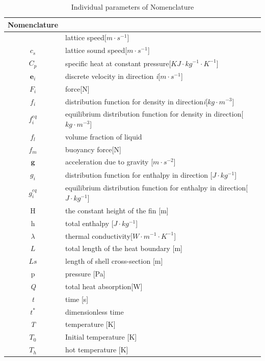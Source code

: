 \documentclass[preprint,12pt]{elsarticle}
\begin{document}
\begin{table}[H]
	\centering
	\footnotesize
	\caption{Individual parameters of Nomenclature}
	\begin{tabular}{cl}
		\toprule
		Nomenclature  &    \\
		\midrule
		\text{c}  & lattice speed[$ m \cdot  s^{-1} $] \\
	$c_{s}$  & lattice sound speed[$ m \cdot  s^{-1} $]    \\
		$C_{p}$ & specific heat at constant pressure[$ KJ \cdot kg^{-1}\cdot K^{-1} $]     \\
	$\boldsymbol{e}_{i}$ & discrete velocity in direction \textit{i}[$ m \cdot  s^{-1} $]  \\
		$F_{i}$ & force[N]    \\
	$f_{i}$& distribution function for density in direction\textit{i}[$ kg \cdot  m^{-3} $]    \\
    $f_i^{eq}$& equilibrium distribution function for density in direction[$ kg \cdot  m^{-3} $]    \\
	$f_{l}$& volume fraction of liquid    \\
	$f_m$&buoyancy force[N]     \\	
	$\mathbf{g}$& acceleration due to gravity [$ m \cdot  s^{-2} $]   \\
    $g_{i}$& distribution function for enthalpy in direction [$ J \cdot  kg^{-1} $]   \\
   	$g_{i}^{eq}$& equilibrium distribution function for enthalpy in direction[$ J \cdot  kg^{-1} $]    \\
	$\text{H}$& the constant height of the fin [m]   \\
	$\text{h}$& total enthalpy [$ J \cdot  kg^{-1} $]   \\
	$\lambda$& thermal conductivity[$ W \cdot m^{-1}\cdot K^{-1} $]      \\
    $\textit{L}$& total length of the heat boundary [m]   \\
   	$\textit{L{s}}$& length of shell cross-section [m]    \\
\textit{$\text{p}$}&  pressure [Pa]   \\	
	\textit{{Q}}& total heat absorption[W]    \\
		\textit{t}& time [s]     \\
$ 	t^{*} $& dimensionless time    \\
	\textit{T}& temperature [K]    \\
$ 	T_{0} $& Initial temperature [K]    \\	
	$ T_{h} $& hot temperature [K]    \\

\end{tabular}
\end{table}
\end{document}
